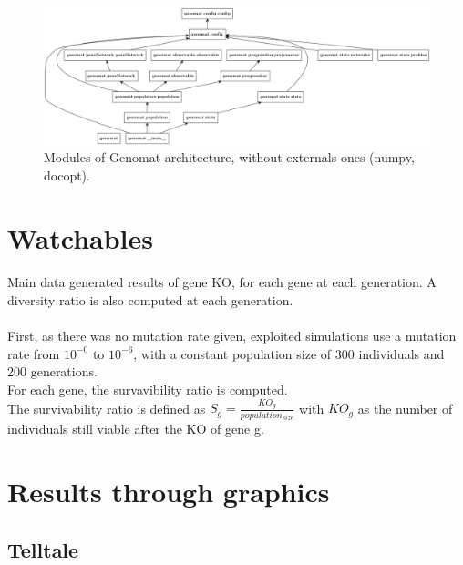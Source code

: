 \documentclass[]{report} %
\begin{document}
        \begin{figure}[H] 
                \centering
                \includegraphics[width=\textwidth]{packages_genomat.png}
                \caption{\footnotesize Modules of Genomat architecture, without externals ones (numpy, docopt).}
                \label{fig:umldiag}
        \end{figure}




\section{Watchables}
    \paragraph*{}
    Main data generated results of gene KO, for each gene at each generation. 
    A diversity ratio is also computed at each generation.
    \paragraph*{}
     First, as there was no mutation rate given, exploited simulations use a mutation rate from $10^{-0}$ to $10^{-6}$, 
     with a constant population size of 300 individuals and 200 generations.\\
     For each gene, the survavibility ratio is computed. \\The survivability ratio is defined as $S_{g} = \frac{KO_g}{population_{size}}$ 
     with $KO_g$ as the number of individuals still viable after the KO of gene g.



\section*{Results through graphics}
\subsection{Telltale}
\end{document}
